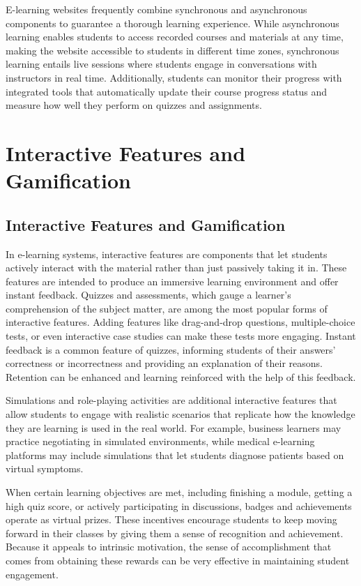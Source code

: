\documentclass[BTech]{audiss}
\begin{document}
E-learning websites frequently combine synchronous and asynchronous components to guarantee a thorough learning experience. While asynchronous learning enables students to access recorded courses and materials at any time, making the website accessible to students in different time zones, synchronous learning entails live sessions where students engage in conversations with instructors in real time. Additionally, students can monitor their progress with integrated tools that automatically update their course progress status and measure how well they perform on quizzes and assignments.
\newpage
\section{Interactive Features and Gamification}
\subsection{Interactive Features and Gamification}
In e-learning systems, interactive features are components that let students actively interact with the material rather than just passively taking it in. These features are intended to produce an immersive learning environment and offer instant feedback. Quizzes and assessments, which gauge a learner's comprehension of the subject matter, are among the most popular forms of interactive features. Adding features like drag-and-drop questions, multiple-choice tests, or even interactive case studies can make these tests more engaging. Instant feedback is a common feature of quizzes, informing students of their answers' correctness or incorrectness and providing an explanation of their reasons. Retention can be enhanced and learning reinforced with the help of this feedback.

Simulations and role-playing activities are additional interactive features that allow students to engage with realistic scenarios that replicate how the knowledge they are learning is used in the real world. For example, business learners may practice negotiating in simulated environments, while medical e-learning platforms may include simulations that let students diagnose patients based on virtual symptoms.

When certain learning objectives are met, including finishing a module, getting a high quiz score, or actively participating in discussions, badges and achievements operate as virtual prizes. These incentives encourage students to keep moving forward in their classes by giving them a sense of recognition and achievement. Because it appeals to intrinsic motivation, the sense of accomplishment that comes from obtaining these rewards can be very effective in maintaining student engagement.
\end{document}
